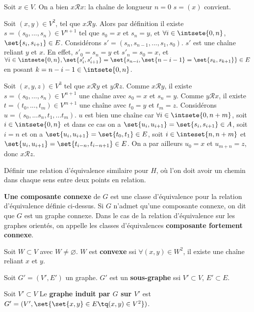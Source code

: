 \documentclass{scrartcl}
\begin{document}
			\begin{demo}
				\item Soit $x \in V$. On a bien $x\mathcal{R}x$: la chaîne de longueur $n=0$ $s = (x)$ convient.
				\item Soit $(x,y) \in V^2$, tel que $x \mathcal{R}y$. 
					Alors par définition il existe $s = (s_0,...,s_n) \in V^{n+1}$ tel que $s_0 = x$ et $s_n = y$,
					et $\forall i \in \intsete{0,n}$, $\set{s_i,s_{i+1}} \in E$.
					Considérons $s' = (s_n,s_{n-1},...,s_1,s_0)$. $s'$ est une chaîne reliant $y$ et $x$.
					En effet, $s'_0 = s_n = y$ et $s'_n = s_0 = x$, et $\forall i \in \intsete{0,n}, 
					\set{s'_{i},s'_{i+1}} = \set{s_{n-i},\set{n-i-1} = \set{s_k,s_{k+1}}} \in E$ en posant $k = n-i-1 \in \intsete{0,n}$.
				\item Soit $(x,y,z) \in V^3$ tel que $x\mathcal{R}y$ et $y\mathcal{R}z$.
					Comme $x\mathcal{R}y$, il existe $s = (s_0,...,s_n) \in V^{n+1}$ une chaîne avec $s_0 = x$ et $s_n = y$.
					Comme $y\mathcal{R}x$, il existe $t = (t_0,...,t_m) \in V^{m+1}$ une chaîne avec $t_0 = y$ et $t_m = z$.
					Considérons $u = (s_0,...s_n,t_1,...t_m)$.
					$u$ est bien une chaîne car $\forall i \in \intsete{0,n+m}$, soit $i \in \intsete{0,n}$ et dans ce cas on a 
					$\set{u_i, u_{i+1}} = \set{s_i,s_{i+1}} \in A$, soit $i = n$ et on a $\set{u_i,u_{i+1}} = \set{t_0,t_1} \in E$,
					soit $i \in \inteset{n,n+m}$ et $\set{u_i,u_{i+1}} = \set{t_{i-n},t_{i-n+1}} \in E$.
					On a par ailleurs $u_0 = x$ et $u_{m+n} = z$, donc $x\mathcal{R}z$.
			\end{demo}

			\exo Définir une relation d'équivalence similaire pour $H$, où l'on doit avoir un chemin dans chaque sens entre deux points en relation.

			 \textbf{Une composante connexe} de $G$ est une classe d'équivalence pour la relation d'équivalence définie ci-dessus.
			Si $G$ n'admet qu'une composante connexe, on dit que $G$ est un graphe connexe. 
			Dans le cas de la relation d'équivalence sur les graphes orientés, on appelle les classes d'équivalences \textbf{composante fortement connexe}.

			 Soit $W \subset V$ avec $W \neq \varnothing$. 
			$W$ est \textbf{convexe} ssi $\forall(x,y) \in W^2$, il existe une chaîne reliant $x$ et $y$.


			 Soit $G' = (V',E')$ un graphe.
			$G'$ est un \textbf{sous-graphe} ssi $V' \subset V$, $E' \subset E$.

			 Soit $V' \subset V$
			Le \textbf{graphe induit par $G$ sur $V'$} est $G' = (V', \set{\set{x,y}\in E \tq (x,y) \in V^2})$.
\end{document}
